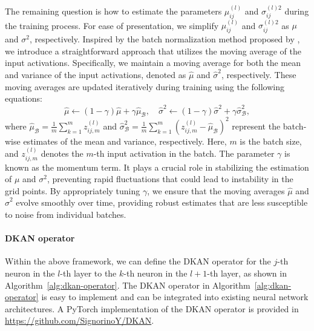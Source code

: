 \documentclass[11pt]{scrartcl}
\begin{document}
The remaining question is how to estimate the parameters $\mu_{ij}^{(l)}$ and $\sigma_{ij}^{(l)2}$ during the training process. For ease of presentation, we simplify $\mu_{ij}^{(l)}$ and $\sigma_{ij}^{(l)2}$ as $\mu$ and $\sigma^{2}$, respectively.
Inspired by the batch normalization method proposed by \citet{ioffe2015batch}, we introduce a straightforward approach that utilizes the moving average of the input activations. Specifically, we maintain a moving average for both the mean and variance of the input activations, denoted as $\widehat{\mu}$ and $\widehat{\sigma}^{2}$, respectively. These moving averages are updated iteratively during training using the following equations:
\begin{equation}
	\widehat{\mu} \leftarrow (1 - \gamma)\widehat{\mu} + \gamma\widehat{\mu}_{\mathcal{B}}, \quad \widehat{\sigma}^{2} \leftarrow (1 - \gamma)\widehat{\sigma}^{2} + \gamma\widehat{\sigma}_{\mathcal{B}}^{2},
\end{equation}
where $\widehat{\mu}_{\mathcal{B}} = \frac{1}{m}\sum_{k=1}^{m}z_{ij,m}^{(l)}$ and $\widehat{\sigma}_{\mathcal{B}}^{2} = \frac{1}{m}\sum_{k=1}^{m}\left(z_{ij,m}^{(l)} - \widehat{\mu}_{\mathcal{B}}\right)^{2}$ represent the batch-wise estimates of the mean and variance, respectively. Here, $m$ is the batch size, and $z_{ij,m}^{(l)}$ denotes the $m$-th input activation in the batch.
The parameter $\gamma$ is known as the momentum term. It plays a crucial role in stabilizing the estimation of $\mu$ and $\sigma^{2}$, preventing rapid fluctuations that could lead to instability in the grid points. By appropriately tuning $\gamma$, we ensure that the moving averages $\widehat{\mu}$ and $\widehat{\sigma}^{2}$ evolve smoothly over time, providing robust estimates that are less susceptible to noise from individual batches.

\paragraph*{DKAN operator}

Within the above framework, we can define the DKAN operator for the $j$-th neuron in the $l$-th layer to the $k$-th neuron in the $l+1$-th layer, as shown in Algorithm~\ref{alg:dkan-operator}.
The DKAN operator in Algorithm~\ref{alg:dkan-operator} is easy to implement and can be integrated into existing neural network architectures. A PyTorch implementation of the DKAN operator is provided in \href{https://github.com/SignorinoY/DKAN}{https://github.com/SignorinoY/DKAN}.
\end{document}
